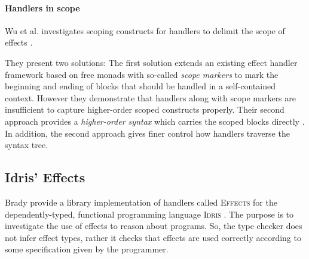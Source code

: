 \paragraph{Handlers in scope}
Wu et al. investigates scoping constructs for handlers to delimit the scope of effects \cite{Wu2014}.

They present two solutions: The first solution extends an existing effect handler framework based on free monads with so-called \emph{scope markers} to mark the beginning and ending of blocks that should be handled in a self-contained context. However they demonstrate that handlers along with scope markers are insufficient to capture higher-order scoped constructs properly.
Their second approach provides a \emph{higher-order syntax} which carries the scoped blocks directly \cite{Wu2014}. In addition, the second approach gives finer control how handlers traverse the syntax tree. %

\subsection{Idris' Effects}
Brady provide a library implementation of handlers called {\scshape{Effects}} for the dependently-typed, functional programming language {\scshape{Idris}} \cite{Brady2013}. The purpose is to investigate the use of effects to reason about programs. So, the type checker does not infer effect types, rather it checks that effects are used correctly according to some specification given by the programmer.